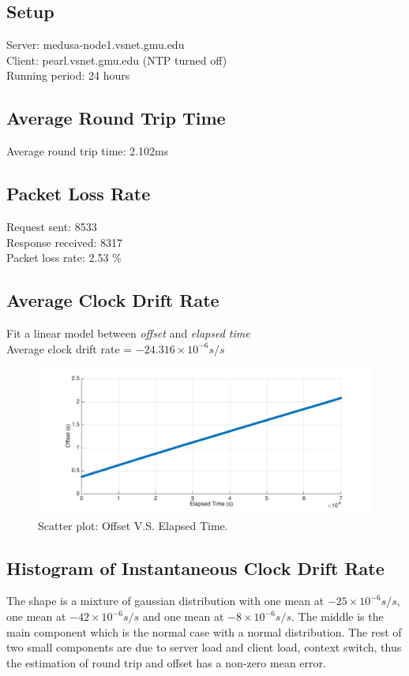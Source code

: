 \documentclass[11pt, oneside]{article}   	%
\begin{document}
\subsection{Setup}
Server: medusa-node1.vsnet.gmu.edu \\
Client: pearl.vsnet.gmu.edu (NTP turned off)\\
Running period: 24 hours

\subsection{Average Round Trip Time}
Average round trip time: 2.102ms

\subsection{Packet Loss Rate}
Request sent: 8533 \\
Response received: 8317 \\
Packet loss rate: 2.53 \%

\subsection{Average Clock Drift Rate}
Fit a linear model between {\it offset} and {\it elapsed time} \\ 
Average clock drift rate =  $-24.316 \times 10^{-6}s/s$

\begin{figure}[ht] %
   \centering
   \includegraphics[width=6in]{../offset.png} 
   \caption{Scatter plot: Offset V.S. Elapsed Time.}
   \label{fig:cdr}
\end{figure}

\subsection{Histogram of Instantaneous Clock Drift Rate}
The shape is a mixture of gaussian distribution with one mean at $-25 \times 10^{-6} s/s$, one mean at $-42 \times 10^{-6} s/s$ and one mean at $-8 \times 10^{-6} s/s $. The middle is the main component which is the normal case with a normal distribution. The rest of two small components are due to server load and client load, context switch, thus the estimation of round trip and offset has a non-zero mean error.
\end{document}
